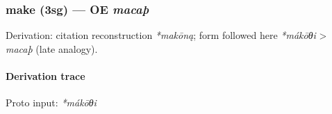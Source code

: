 \documentclass[
  british,
  a4paper,
]{article}
\begin{document}
\subsubsection{\texorpdfstring{make (3sg) --- OE
\emph{macaþ}}{make (3sg) --- OE macaþ}}\label{make-3sg-oe-macauxfe}

Derivation: citation reconstruction \emph{*makōną}; form followed here
\emph{*mákōθi} \textgreater{} \emph{macaþ} (late analogy).

\paragraph{Derivation trace}\label{derivation-trace-161}

Proto input: \emph{*mákōθi}

\begingroup
\setlength{\fboxsep}{6pt}
\end{document}
